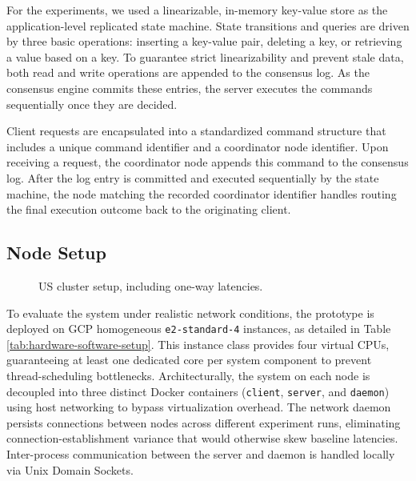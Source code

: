 For the experiments, we used a linearizable, in-memory key-value store as the application-level replicated state machine. State transitions and queries are driven by three basic operations: inserting a key-value pair, deleting a key, or retrieving a value based on a key. To guarantee strict linearizability and prevent stale data, both read and write operations are appended to the consensus log. As the consensus engine commits these entries, the server executes the commands sequentially once they are decided.

Client requests are encapsulated into a standardized command structure that includes a unique command identifier and a coordinator node identifier. Upon receiving a request, the coordinator node appends this command to the consensus log. After the log entry is committed and executed sequentially by the state machine, the node matching the recorded coordinator identifier handles routing the final execution outcome back to the originating client.

\subsection{Node Setup}
\label{sect:node_setup}
\begin{figure}[t]
    \centering
    
    \caption{US cluster setup, including one-way latencies.}
    \label{fig:us-cluster-setup}
\end{figure}

To evaluate the system under realistic network conditions, the prototype is deployed on \gls{GCP} homogeneous \texttt{e2-standard-4} instances, as detailed in Table \ref{tab:hardware-software-setup}. This instance class provides four virtual CPUs, guaranteeing at least one dedicated core per system component to prevent thread-scheduling bottlenecks. Architecturally, the system on each node is decoupled into three distinct Docker containers (\texttt{client}, \texttt{server}, and \texttt{daemon}) using host networking to bypass virtualization overhead. The network daemon persists connections between nodes across different experiment runs, eliminating connection-establishment variance that would otherwise skew baseline latencies. Inter-process communication between the server and daemon is handled locally via Unix Domain Sockets.

